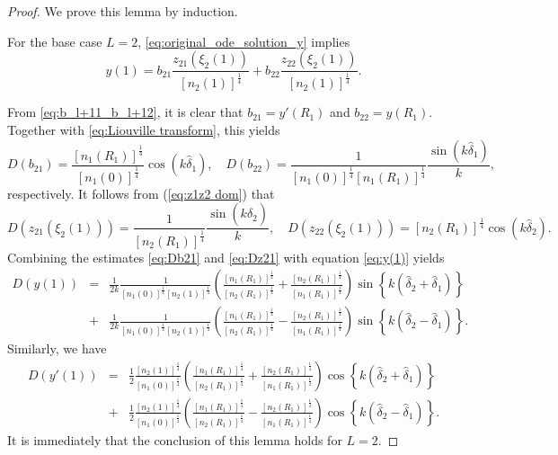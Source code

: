 \documentclass[11pt,reqno]{amsart}
\theoremstyle{definition}
\theoremstyle{remark}
\numberwithin{equation}{section}
\begin{document}
\begin{proof}
We prove this lemma by induction.

For the base case $L=2$, \eqref{eq:original_ode_solution_y} implies
\begin{equation}\label{eq:y(1)}
y(1)=b_{21}\frac{z_{21}\left(\xi_2(1)\right)}{\left[n_{2}(1)\right]^{\frac{1}{4}}}+b_{22}\frac{z_{22}(\xi_2(1))}{\left[n_{2}(1)\right]^{\frac{1}{4}}}.
\end{equation}

From \eqref{eq:b_l+11_b_l+12}, it is clear that $b_{21}=y'(R_1)$ and $b_{22}=y(R_1)$. Together with \eqref{eq:Liouville transform}, this yields
\begin{equation}\label{eq:Db21}
	D(b_{21})=\frac{\left[n_1(R_1)\right]^{\frac{1}{4}}}{\left[n_1(0)\right]^{\frac{1}{4}}}\cos\left(k\hat{\delta}_1\right),\quad
	D(b_{22})=\frac{1}{\left[n_1(0)\right]^{\frac{1}{4}}\left[n_1(R_1)\right]^{\frac{1}{4}}}\frac{\sin\left(k\hat{\delta}_1\right)}{k},
\end{equation}
respectively. It follows from (\ref{eq:z1z2 dom}) that
\begin{equation}\label{eq:Dz21}
	D(z_{21}\left(\xi_2(1)\right))=\frac{1}{\left[n_{2}(R_1)\right]^{\frac{1}{4}}}\frac{\sin\left(k\hat{\delta}_2\right)}{k},\quad
	D(z_{22}\left(\xi_2(1)\right))=\left[n_{2}(R_1)\right]^{\frac{1}{4}}\cos\left(k\hat{\delta}_2\right).
\end{equation}
Combining the estimates \eqref{eq:Db21} and \eqref{eq:Dz21} with equation \eqref{eq:y(1)} yields
\begin{eqnarray*}
D(y(1))&=&\frac{1}{2k}\frac{1}{\left[n_{1}(0)\right]^{\frac{1}{4}}\left[n_{2}(1)\right]^{\frac{1}{4}}}\left(\frac{\left[n_{1}(R_1)\right]^{\frac{1}{4}}}{\left[n_{2}(R_1)\right]^{\frac{1}{4}}}+\frac{\left[n_{2}(R_1)\right]^{\frac{1}{4}}}{\left[n_{1}(R_1)\right]^{\frac{1}{4}}}\right)\sin\left\{k\left(\hat{\delta}_2+\hat{\delta}_1\right)\right\}\\
		&+&\frac{1}{2k}\frac{1}{\left[n_{1}(0)\right]^{\frac{1}{4}}\left[n_{2}(1)\right]^{\frac{1}{4}}}\left(\frac{\left[n_{1}(R_1)\right]^{\frac{1}{4}}}{\left[n_{2}(R_1)\right]^{\frac{1}{4}}}-\frac{\left[n_{2}(R_1)\right]^{\frac{1}{4}}}{\left[n_{1}(R_1)\right]^{\frac{1}{4}}}\right)\sin\left\{k\left(\hat{\delta}_2-\hat{\delta}_1\right)
		\right\}.
\end{eqnarray*}
Similarly, we have
\begin{eqnarray*}
D(y'(1))&=& \frac{1}{2}\frac{\left[n_{2}(1)\right]^{\frac{1}{4}}}{\left[n_{1}(0)\right]^{\frac{1}{4}}}\left(\frac{\left[n_{1}(R_1)\right]^{\frac{1}{4}}}{\left[n_{2}(R_1)\right]^{\frac{1}{4}}}+\frac{\left[n_{2}(R_1)\right]^{\frac{1}{4}}}{\left[n_{1}(R_1)\right]^{\frac{1}{4}}}\right)\cos\left\{k\left(\hat{\delta}_2+\hat{\delta}_1\right)\right\}\\
		&+&\frac{1}{2}\frac{\left[n_{2}(1)\right]^{\frac{1}{4}}}{\left[n_{1}(0)\right]^{\frac{1}{4}}}\left(\frac{\left[n_{1}(R_1)\right]^{\frac{1}{4}}}{\left[n_{2}(R_1)\right]^{\frac{1}{4}}}-\frac{\left[n_{2}(R_1)\right]^{\frac{1}{4}}}{\left[n_{1}(R_1)\right]^{\frac{1}{4}}}\right)\cos\left\{k\left(\hat{\delta}_2-\hat{\delta}_1\right)\right\}.
\end{eqnarray*}
It is immediately that the conclusion of this lemma holds for $L=2$.


\end{proof}
\end{document}
